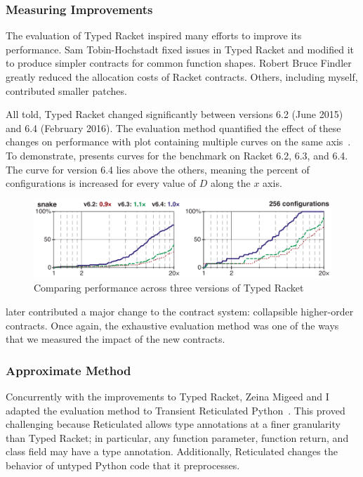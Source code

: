 \subsubsection{Measuring Improvements}

The evaluation of Typed Racket inspired many efforts to improve its performance.
Sam Tobin-Hochstadt fixed issues in Typed Racket and modified it to produce
 simpler contracts for common function shapes.
Robert Bruce Findler greatly reduced the allocation costs of Racket contracts.
Others, including myself, contributed smaller patches.

All told, Typed Racket changed significantly between versions 6.2 (June 2015)
 and 6.4 (February 2016).
The evaluation method quantified the effect of these changes on
 performance with plot containing multiple  curves on the same
 axis~\cite{gtnffvf-jfp-2019}.
To demonstrate,  presents curves for the 
 benchmark on Racket 6.2, 6.3, and 6.4.
The curve for version 6.4 lies above the others, meaning the percent of
  configurations is increased for every value of $D$ along
 the $x$ axis.

\begin{figure}[h]
\includegraphics[width=0.8\columnwidth]{src/snake-jfp.png}
\caption{Comparing performance across three versions of Typed Racket}
\label{fig:snake-jfp}
\end{figure}

\citet{fgsfs-oopsla-2018} later contributed a major change to the contract system:
 collapsible higher-order contracts.
Once again, the exhaustive evaluation method was one of the ways that we
 measured the impact of the new contracts.


\subsubsection{Approximate Method}

Concurrently with the improvements to Typed Racket, Zeina Migeed and I
 adapted the evaluation method to Transient Reticulated Python~\cite{gm-pepm-2018}.
This proved challenging because Reticulated allows type annotations
 at a finer granularity than Typed Racket; in particular, any function
 parameter, function return, and class field may have a type annotation.
Additionally, Reticulated changes the behavior of untyped Python code that
 it preprocesses.

